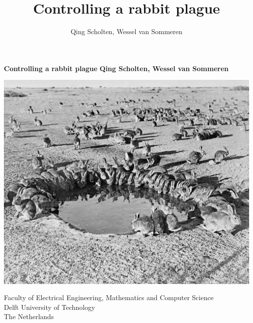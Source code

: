 \documentclass{article}
\author{Qing Scholten, Wessel van Sommeren}
\title{Controlling a rabbit plague}
\begin{document}
\begin{titlepage}
   \begin{center}
       \vspace*{1cm}

       \Huge
        \textbf{Controlling a rabbit plague}
       \vspace{1.5cm}
       \large
        \textbf{Qing Scholten, Wessel van Sommeren}
        
       \vfill
       \begin{center}
           \includegraphics[width=1\textwidth]{Pictures/Rabbits-around-the-waterhole-1400.jpg}\cite{Frontpic}
       \end{center}
       
       Faculty of Electrical Engineering, Mathematics and Computer Science\\
       Delft University of Technology\\
       The Netherlands\\
            
   \end{center}
\end{titlepage}
\tableofcontents
\newpage
\end{document}
